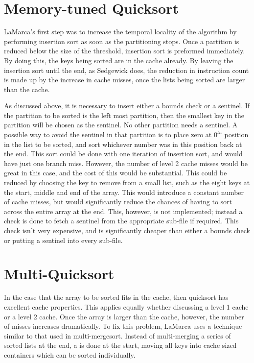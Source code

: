 \section{Memory-tuned Quicksort}

LaMarca's first step was to increase the temporal locality of the algorithm by
performing insertion sort as soon as the partitioning stops. Once a partition is
reduced below the size of the threshold, insertion sort is preformed
immediately. By doing this, the keys being sorted are in the cache already. By
leaving the insertion sort until the end, as Sedgewick does, the reduction in
instruction count is made up by the increase in cache misses, once the
lists being sorted are larger than the cache. 

As discussed above, it is necessary to insert either a bounds check or a
sentinel.  If the partition to be sorted is the left most partition, then the
smallest key in the partition will be chosen as the sentinel. No other
partition needs a sentinel. A possible way to avoid the sentinel in that
partition is to place zero at $0^{th}$ position in the list to be sorted, and
sort whichever number was in this position back at the end. This sort could be
done with one iteration of insertion sort, and would have just one branch miss.
However, the number of level 2 cache misses would be great in this case,
and the cost of this would be substantial. This could be reduced by
choosing the key to remove from a small list, such as the eight keys at the
start, middle and end of the array. This would introduce a constant number of
cache misses, but would significantly reduce the chances of having to sort
across the entire array at the end. This, however, is not implemented; instead a
check is done to fetch a sentinel from the appropriate sub-file if required. This
check isn't very expensive, and is significantly cheaper than either a bounds
check or putting a sentinel into every sub-file.

\section{Multi-Quicksort}

In the case that the array to be sorted fits in the cache, then quicksort has
excellent cache properties. This applies equally whether discussing a level 1
cache or a level 2 cache. Once the array is larger than the cache, however, the
number of misses increases dramatically. To fix this problem, LaMarca uses a
technique similar to that used in multi-mergesort. Instead of multi-merging a
series of sorted lists at the end, a  is done at the
start, moving all keys into cache sized containers which can be sorted
individually.

